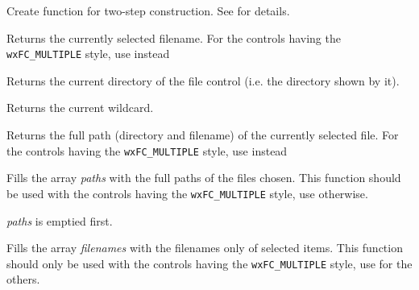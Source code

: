 Create function for two-step construction. See  for details.

\label{wxfilectrlgetfilename}


Returns the currently selected filename.
For the controls having the {\tt wxFC\_MULTIPLE} style, use 
instead

\label{wxfilectrlgetdirectory}


Returns the current directory of the file control (i.e. the directory shown by
it).

\label{wxfilectrlgetwildcard}


Returns the current wildcard.

\label{wxfilectrlgetpath}


Returns the full path (directory and filename) of the currently selected file.
For the controls having the {\tt wxFC\_MULTIPLE} style, use 
instead

\label{wxfilectrlgetpaths}


Fills the array {\it paths} with the full paths of the files chosen. This
function should be used with the controls having the {\tt wxFC\_MULTIPLE} style,
use  otherwise.


{\it paths} is emptied first.

\label{wxfilectrlgetfilenames}


Fills the array {\it filenames} with the filenames only of selected items. This
function should only be used with the controls having the {\tt wxFC\_MULTIPLE} style,
use  for the others.

